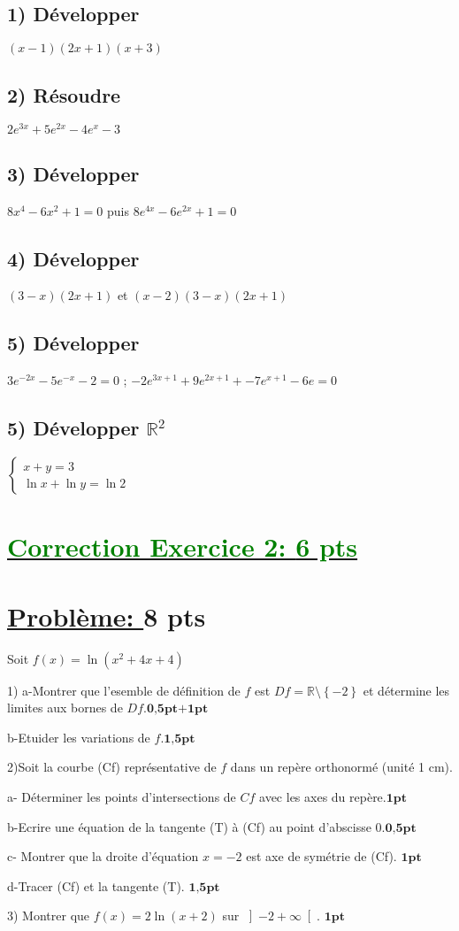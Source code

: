 \documentclass[12pt]{article}
\begin{document}
\subsection*{ 1) Développer } $(x-1)(2x+1)(x+3)$
\subsection*{ 2) Résoudre } $2e^{3x}+5e^{2x}-4e^{x}-3$
\subsection*{ 3) Développer } $8x^{4}-6x^{2}+1=0$ puis $8e^{4x}-6e^{2x}+1=0$
\subsection*{ 4) Développer } $(3-x)(2x+1)$ et $(x-2)(3-x)(2x+1)$
\subsection*{ 5) Développer } $3e^{-2x}-5e^{-x}-2=0$ ; $-2e^{3x+1}+9e^{2x+1}+-7e^{x+1}-6e=0$
\subsection*{ 5) Développer $\mathbb{R}^{2}$} 
\( \begin{cases}
x + y = 3 \\
\ln x + \ln y = \ln 2
\end{cases}\)
\section*{\underline{\textcolor{green}{Correction Exercice 2: \textbf{6 pts}}}}
\section*{\underline{Problème: }\textbf{8 pts}}
Soit $f(x)=\ln(x^{2}+4x+4)$

1) a-Montrer que l'esemble de définition de $f$ est $Df=\mathbb{R}\setminus\left\lbrace -2 \right\rbrace $ et détermine les limites aux bornes de $Df$.$\textbf{0,5pt+1pt}$

b-Etuider les variations de $f$.$\textbf{1,5pt}$

2)Soit la courbe (Cf) représentative de $f$ dans un repère orthonormé (unité 1 cm).

a- Déterminer les points d'intersections de $Cf$ avec les axes du repère.$\textbf{1pt}$

b-Ecrire une équation de la tangente (T) à (Cf) au point d'abscisse 0.$\textbf{0,5pt}$

c- Montrer que la droite d'équation $x=-2$ est axe de  symétrie de (Cf). $\textbf{1pt}$

d-Tracer (Cf) et la tangente (T). $\textbf{1,5pt}$

3) Montrer que $f(x)=2\ln(x+2)$ sur $ \left]-2 +\infty \right[ $. $\textbf{1pt}$
\end{document}
